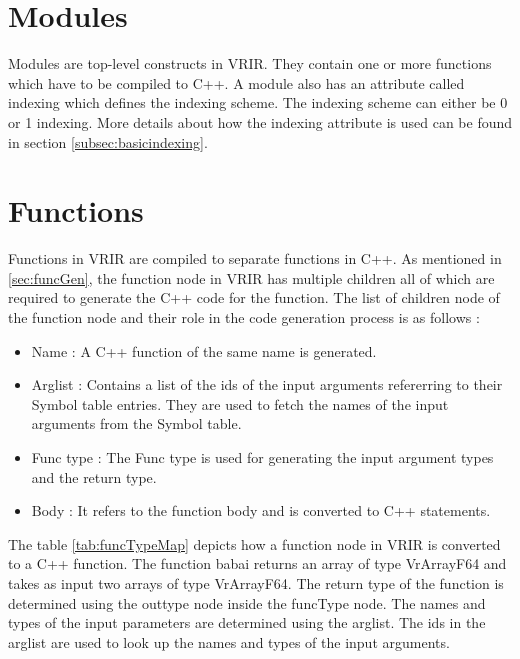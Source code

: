 \section{Modules}
Modules are top-level constructs in VRIR. They contain one or more functions which have to be compiled to C++. A module also has an attribute called indexing which defines the indexing scheme. The indexing scheme can either be 0 or 1 indexing. More details about how the indexing attribute is used can be found in section \ref{subsec:basicindexing}.
\section{Functions} 
\label{sec:functions}
Functions in VRIR are compiled to separate functions in C++. As mentioned in \ref{sec:funcGen}, the function node in VRIR has multiple children all of which are required to generate the C++ code for the function. The list of children node of the function node and their role in the code generation process is as follows :
\begin{itemize}
\item Name : A C++ function of the same name is generated.   
\item Arglist : Contains a list of the ids of the input arguments refererring to their Symbol table entries. They are used to fetch the names of the input arguments from the Symbol table. 
\item Func type : The Func type is used for generating the input argument types and the return type.
\item Body : It refers to the function body and is converted to C++ statements. 
\end{itemize}
The table \ref{tab:funcTypeMap} depicts how a function node in VRIR is converted to a C++ function. The function babai returns an array of type VrArrayF64 and takes as input two arrays of type VrArrayF64.
The return type of the function is determined using the outtype node inside the funcType node. The names and types of the input parameters are determined using the arglist. The ids in the arglist are used to look up the names and types of the input arguments. 
